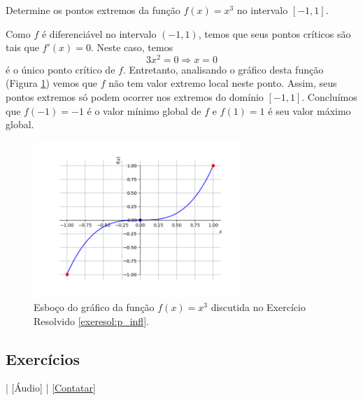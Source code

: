 \begin{exeresol}\label{exeresol:p_infl}
  Determine os pontos extremos da função $f(x)=x^3$ no intervalo $[-1, 1]$.
\end{exeresol}
\begin{resol}
  Como $f$ é diferenciável no intervalo $(-1, 1)$, temos que seus pontos críticos são tais que $f'(x)=0$. Neste caso, temos
  \begin{equation}
    3x^2=0\Rightarrow x=0
  \end{equation}
  é o único ponto crítico de $f$. Entretanto, analisando o gráfico desta função (Figura \ref{fig:exeresol_p_infl}) vemos que $f$ não tem valor extremo local neste ponto. Assim, seus pontos extremos só podem ocorrer nos extremos do domínio $[-1, 1]$. Concluímos que $f(-1)=-1$ é o valor mínimo global de $f$ e $f(1)=1$ é seu valor máximo global.

  \begin{figure}[H]
    \centering
    \includegraphics[width=0.7\textwidth]{./cap_apderiv/dados/fig_exeresol_p_infl/fig_exeresol_p_infl}
    \caption{Esboço do gráfico da função $f(x) = x^3$ discutida no Exercício Resolvido \ref{exeresol:p_infl}.}
    \label{fig:exeresol_p_infl}
  \end{figure}
\end{resol}

\subsection*{Exercícios}

\begin{flushright}
  [Vídeo] | [Áudio] | \href{https://phkonzen.github.io/notas/contato.html}{[Contatar]}
\end{flushright}

